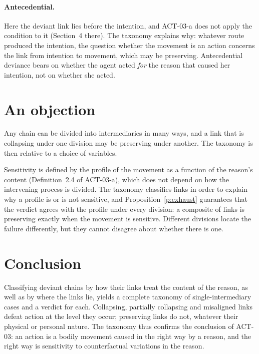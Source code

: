 \documentclass{situationist-preprint}
\begin{document}
\paragraph{Antecedential.} Here the deviant link lies before the intention, and ACT-03-a does not apply the condition to it (Section~4 there). The taxonomy explains why: whatever route produced the intention, the question whether the movement is an action concerns the link from intention to movement, which may be preserving. Antecedential deviance bears on whether the agent acted \emph{for} the reason that caused her intention, not on whether she acted.

\section{An objection}

\begin{objection}
Any chain can be divided into intermediaries in many ways, and a link that is collapsing under one division may be preserving under another. The taxonomy is then relative to a choice of variables.
\end{objection}

\begin{reply}
Sensitivity is defined by the profile of the movement as a function of the reason's content (Definition~2.4 of ACT-03-a), which does not depend on how the intervening process is divided. The taxonomy classifies links in order to explain why a profile is or is not sensitive, and Proposition~\ref{p:exhaust} guarantees that the verdict agrees with the profile under every division: a composite of links is preserving exactly when the movement is sensitive. Different divisions locate the failure differently, but they cannot disagree about whether there is one.
\end{reply}

\section{Conclusion}

Classifying deviant chains by how their links treat the content of the reason, as well as by where the links lie, yields a complete taxonomy of single-intermediary cases and a verdict for each. Collapsing, partially collapsing and misaligned links defeat action at the level they occur; preserving links do not, whatever their physical or personal nature. The taxonomy thus confirms the conclusion of ACT-03: an action is a bodily movement caused in the right way by a reason, and the right way is sensitivity to counterfactual variations in the reason.
\end{document}

